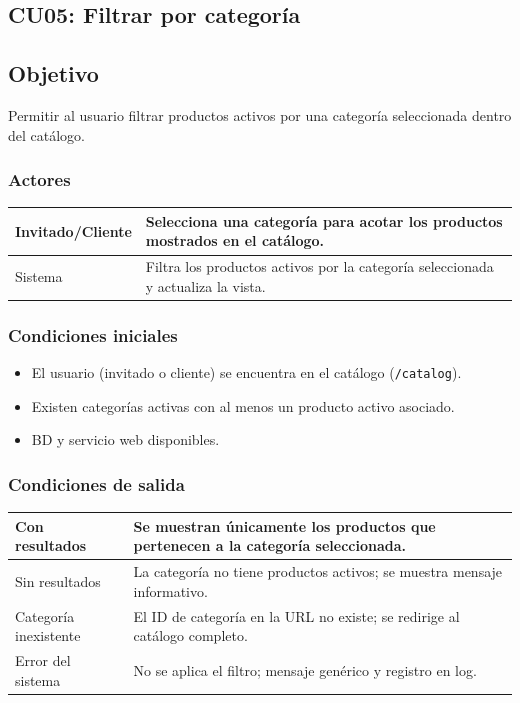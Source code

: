 \documentclass[12pt,a4paper]{article}
\begin{document}

\subsection{CU05: Filtrar por categoría}
\subsection*{Objetivo}
Permitir al usuario filtrar productos activos por una categoría seleccionada dentro del catálogo.

\subsubsection*{Actores}
\begin{longtable}{|l|p{10cm}|}
    \hline
    Invitado/Cliente & Selecciona una categoría para acotar los productos mostrados en el catálogo.     \\ \hline
    Sistema          & Filtra los productos activos por la categoría seleccionada y actualiza la vista. \\ \hline
\end{longtable}

\subsubsection*{Condiciones iniciales}
\begin{itemize}[label=--]
    \item El usuario (invitado o cliente) se encuentra en el catálogo (\texttt{/catalog}).
    \item Existen categorías activas con al menos un producto activo asociado.
    \item BD y servicio web disponibles.
\end{itemize}

\subsubsection*{Condiciones de salida}
\begin{longtable}{|l|p{10cm}|}
    \hline
    Con resultados        & Se muestran únicamente los productos que pertenecen a la categoría seleccionada. \\ \hline
    Sin resultados        & La categoría no tiene productos activos; se muestra mensaje informativo.         \\ \hline
    Categoría inexistente & El ID de categoría en la URL no existe; se redirige al catálogo completo.        \\ \hline
    Error del sistema     & No se aplica el filtro; mensaje genérico y registro en log.                      \\ \hline
\end{longtable}
\end{document}
